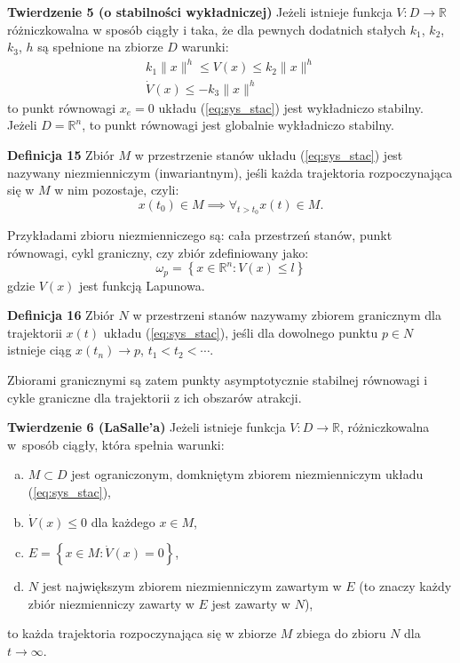 \documentclass{article}
\begin{document}
\textbf{Twierdzenie 5 (o stabilności wykładniczej)}
Jeżeli istnieje funkcja $V:D\rightarrow\mathbb{R}$ różniczkowalna w sposób ciągły i taka, że dla pewnych dodatnich stałych $k_{1}$, $k_{2}$, $k_{3}$, $h$ są spełnione na zbiorze $D$ warunki:
\begin{equation}\label{eq:stab_wyk}
    \begin{array}{c}
         k_{1}\lVert x \rVert^{h} \leq V(x) \leq k_{2}\lVert x \rVert^{h}\\
         \dot{V}(x) \leq -k_{3}\lVert x \rVert^{h}
    \end{array}
\end{equation}
to punkt równowagi $x_{e} = 0$ układu (\ref{eq:sys_stac}) jest wykładniczo stabilny. Jeżeli $D = \mathbb{R}^{n}$, to punkt równowagi jest globalnie wykładniczo stabilny.

\textbf{Definicja 15}
Zbiór $M$ w przestrzenie stanów układu (\ref{eq:sys_stac}) jest nazywany niezmienniczym (inwariantnym), jeśli każda trajektoria rozpoczynająca się w $M$ w nim pozostaje, czyli:
\begin{equation}\label{eq:zbior_inwariantny}
    x(t_{0}) \in M \implies \forall_{t > t_{0}}x(t) \in M.
\end{equation}

Przykładami zbioru niezmienniczego są: cała przestrzeń stanów, punkt równowagi, cykl graniczny, czy zbiór zdefiniowany jako:
$$
    \omega_{p} = \left\{ x \in \mathbb{R}^{n}:V(x) \leq l \right\}
$$
gdzie $V(x)$ jest funkcją Lapunowa.

\textbf{Definicja 16}
Zbiór $N$ w przestrzeni stanów nazywamy zbiorem granicznym dla trajektorii $x(t)$ układu (\ref{eq:sys_stac}), jeśli dla dowolnego punktu $p \in N$ istnieje ciąg $x(t_{n}) \rightarrow p$, $t_{1} < t_{2} < \cdots$.

Zbiorami granicznymi są zatem punkty asymptotycznie stabilnej równowagi i cykle graniczne dla trajektorii z ich obszarów atrakcji.

\textbf{Twierdzenie 6 (LaSalle'a)}
Jeżeli istnieje funkcja $V:D\rightarrow\mathbb{R}$, różniczkowalna w~sposób ciągły, która spełnia warunki:
\begin{enumerate}[(a)]
    \item $M \subset D$ jest ograniczonym, domkniętym zbiorem niezmienniczym układu (\ref{eq:sys_stac}),
    \item $\dot{V}(x) \leq 0$ dla każdego $x\in M$,
    \item $E = \left\{ x\in M:\dot{V}(x) = 0 \right\}$,
    \item $N$ jest największym zbiorem niezmienniczym zawartym w $E$ (to znaczy każdy zbiór niezmienniczy zawarty w $E$ jest zawarty w $N$),
\end{enumerate}
to każda trajektoria rozpoczynająca się w zbiorze $M$ zbiega do zbioru $N$ dla $t\rightarrow\infty$.
\end{document}

